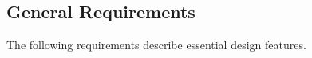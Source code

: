 %
%




\subsection{General Requirements}
\label{sec:genreq}

The following requirements describe essential design features.

